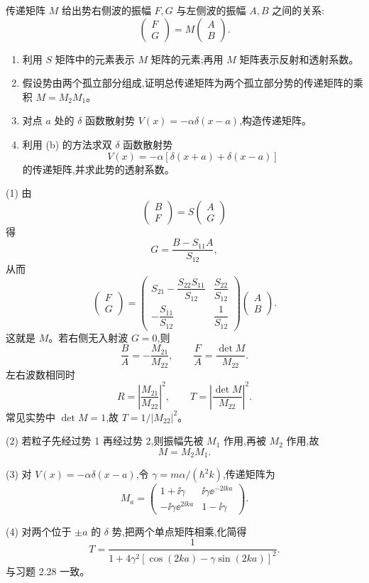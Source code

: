 \begin{question}
传递矩阵 $M$ 给出势右侧波的振幅 $F,G$ 与左侧波的振幅 $A,B$ 之间的关系:
\[
\begin{pmatrix}F\\G\end{pmatrix}=M\begin{pmatrix}A\\B\end{pmatrix}.
\]
\begin{enumerate}
\item 利用 $S$ 矩阵中的元素表示 $M$ 矩阵的元素;再用 $M$ 矩阵表示反射和透射系数。
\item 假设势由两个孤立部分组成,证明总传递矩阵为两个孤立部分势的传递矩阵的乘积 $M=M_2M_1$。
\item 对点 $a$ 处的 $\delta$ 函数散射势 $V(x)=-\alpha\delta(x-a)$,构造传递矩阵。
\item 利用 (b) 的方法求双 $\delta$ 函数散射势
\[
V(x)=-\alpha[\delta(x+a)+\delta(x-a)]
\]
的传递矩阵,并求此势的透射系数。
\end{enumerate}
\end{question}
\begin{solution}
(1) 由
\[
\begin{pmatrix}B\\F\end{pmatrix}
=S\begin{pmatrix}A\\G\end{pmatrix}
\]
得
\[
G=\frac{B-S_{11}A}{S_{12}},
\]
从而
\[
\begin{pmatrix}F\\G\end{pmatrix}
=\begin{pmatrix}
S_{21}-\dfrac{S_{22}S_{11}}{S_{12}}&\dfrac{S_{22}}{S_{12}}\\[0.8em]
-\dfrac{S_{11}}{S_{12}}&\dfrac1{S_{12}}
\end{pmatrix}
\begin{pmatrix}A\\B\end{pmatrix}.
\]
这就是 $M$。若右侧无入射波 $G=0$,则
\[
\frac BA=-\frac{M_{21}}{M_{22}},
\qquad
\frac FA=\frac{\det M}{M_{22}}.
\]
左右波数相同时
\[
R=\left|\frac{M_{21}}{M_{22}}\right|^2,
\qquad
T=\left|\frac{\det M}{M_{22}}\right|^2.
\]
常见实势中 $\det M=1$,故 $T=1/|M_{22}|^2$。

(2) 若粒子先经过势 1 再经过势 2,则振幅先被 $M_1$ 作用,再被 $M_2$ 作用,故
\[
M=M_2M_1.
\]

(3) 对 $V(x)=-\alpha\delta(x-a)$,令 $\gamma=m\alpha/(\hbar^2k)$,传递矩阵为
\[
M_a=\begin{pmatrix}
1+\ii\gamma&\ii\gamma \ee^{-2\ii ka}\\
-\ii\gamma \ee^{2\ii ka}&1-\ii\gamma
\end{pmatrix}.
\]

(4) 对两个位于 $\pm a$ 的 $\delta$ 势,把两个单点矩阵相乘,化简得
\[
T=\frac{1}{1+4\gamma^2[\cos(2ka)-\gamma\sin(2ka)]^2}.
\]
与习题 2.28 一致。
\end{solution}

